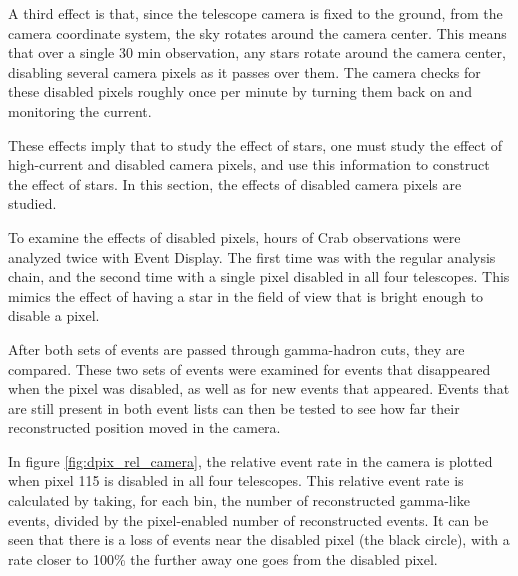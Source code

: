     A third effect is that, since the telescope camera is fixed to the ground, from the camera coordinate system, the sky rotates around the camera center.
    This means that over a single 30 min observation, any stars rotate around the camera center, disabling several camera pixels as it passes over them.
    The camera checks for these disabled pixels roughly once per minute by turning them back on and monitoring the current.

    These effects imply that to study the effect of stars, one must study the effect of high-current and disabled camera pixels, and use this information to construct the effect of stars.
    In this section, the effects of disabled camera pixels are studied.

    To examine the effects of disabled pixels,  hours of Crab observations were analyzed twice with Event Display.
    The first time was with the regular analysis chain, and the second time with a single pixel disabled in all four telescopes.
    This mimics the effect of having a star in the field of view that is bright enough to disable a pixel.

    After both sets of events are passed through gamma-hadron cuts, they are compared.
    These two sets of events were examined for events that disappeared when the pixel was disabled, as well as for new events that appeared.
    Events that are still present in both event lists can then be tested to see how far their reconstructed position moved in the camera.

    In figure \ref{fig:dpix_rel_camera}, the relative event rate in the camera is plotted when pixel 115 is disabled in all four telescopes.
    This relative event rate is calculated by taking, for each bin, the number of reconstructed gamma-like events, divided by the pixel-enabled number of reconstructed events.
    It can be seen that there is a loss of events near the disabled pixel (the black circle), with a rate closer to 100\% the further away one goes from the disabled pixel.

